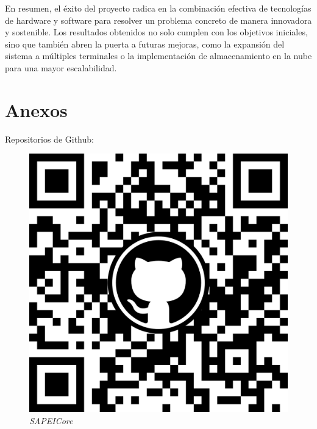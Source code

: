 \documentclass[a4paper, 12pt]{report}
\begin{document}
    En resumen, el éxito del proyecto radica en la combinación efectiva de tecnologías de hardware y software para
    resolver un problema concreto de manera innovadora y sostenible. Los resultados obtenidos no solo cumplen con los
    objetivos iniciales, sino que también abren la puerta a futuras mejoras, como la expansión del sistema a múltiples
    terminales o la implementación de almacenamiento en la nube para una mayor escalabilidad.

\newpage
\section{Anexos}
    Repositorios de Github:
      \begin{figure}[H]
      \centering
      \begin{minipage}{0.3\textwidth}
        \centering
        \includegraphics[width=1\textwidth]{./core.png}
        \textit{SAPEICore}
      \end{minipage}
      \hspace{0.5cm}
      \begin{minipage}{0.3\textwidth}
        \centering

\end{minipage}
\end{figure}
\end{document}
